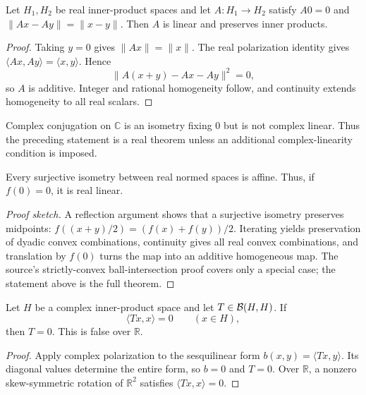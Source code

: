\begin{notetheorem}
Let $H_1,H_2$ be real inner-product spaces and let
$A\colon H_1\to H_2$ satisfy $A0=0$ and
$\|Ax-Ay\|=\|x-y\|$.  Then $A$ is linear and preserves inner products.
\end{notetheorem}

\begin{proof}
Taking $y=0$ gives $\|Ax\|=\|x\|$.  The real polarization identity gives
$\langle Ax,Ay\rangle=\langle x,y\rangle$.  Hence
\[
 \|A(x+y)-Ax-Ay\|^2=0,
\]
so $A$ is additive.  Integer and rational homogeneity follow, and continuity
extends homogeneity to all real scalars.
\end{proof}

\begin{noteexample}
Complex conjugation on $\mathbb C$ is an isometry fixing $0$ but is not
complex linear.  Thus the preceding statement is a real theorem unless an
additional complex-linearity condition is imposed.
\end{noteexample}

\begin{notetheorem}
Every surjective isometry between real normed spaces is affine.  Thus, if
$f(0)=0$, it is real linear.
\end{notetheorem}

\begin{proof}[Proof sketch]
A reflection argument shows that a surjective isometry preserves midpoints:
$f((x+y)/2)=(f(x)+f(y))/2$.  Iterating yields preservation of dyadic convex
combinations, continuity gives all real convex combinations, and translation
by $f(0)$ turns the map into an additive homogeneous map.  The source's
strictly-convex ball-intersection proof covers only a special case; the
statement above is the full theorem.
\end{proof}

\begin{noteexercise}
Let $H$ be a complex inner-product space and let $T\in\mathcal{B}(H,H)$.  If
\[
  \langle Tx,x\rangle=0\qquad(x\in H),
\]
then $T=0$.  This is false over $\mathbb R$.
\end{noteexercise}

\begin{proof}
Apply complex polarization to the sesquilinear form
$b(x,y)=\langle Tx,y\rangle$.  Its diagonal values determine the entire form,
so $b=0$ and $T=0$.  Over $\mathbb R$, a nonzero skew-symmetric rotation of
$\mathbb R^2$ satisfies $\langle Tx,x\rangle=0$.
\end{proof}

